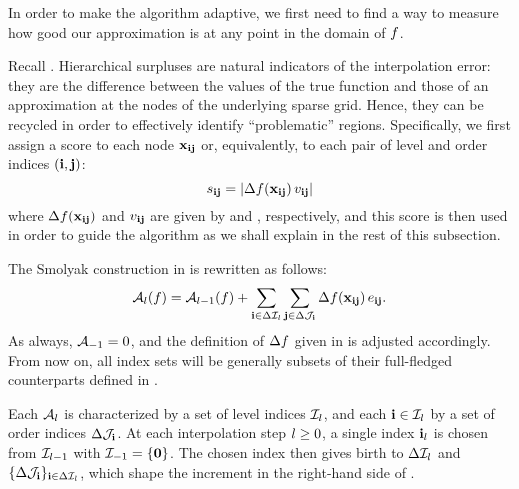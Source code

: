 In order to make the algorithm adaptive, we first need to find a way to measure
how good our approximation is at any point in the domain of $f$. 

 Recall
. Hierarchical surpluses are natural indicators of the
interpolation error: they are the difference between the values of the true
function and those of an approximation at the nodes of the underlying sparse
grid. Hence, they can be recycled in order to effectively identify
``problematic'' regions. Specifically, we first assign a score to each node
$\mathbf{x}_{\mathbf{i}\mathbf{j}}$ or, equivalently, to each pair of level and order indices $(\mathbf{i},
\mathbf{j})$:
\begin{equation} \elab{score}
  \score_{\vi\vj} = \left| \surplus(\vx_{\vi\vj}) \, \w_{\vi\vj} \right|
\end{equation}
where $\Delta f(\mathbf{x}_{\mathbf{i}\mathbf{j}})$ and $v_{\mathbf{i}\mathbf{j}}$ are given by  and
, respectively, and this score is then used in order to guide the
algorithm as we shall explain in the rest of this subsection.

The Smolyak construction in  is rewritten as follows:
\begin{equation} \elab{approximation}
  \approximation{\l}(\f) = \approximation{\l-1}(\f) + \sum_{\vi \in \Delta\lindex_\l} \sum_{\vj \in \Delta\oindex_\vi} \surplus(\vx_{\vi\vj}) \,
\e_{\vi\vj}.
\end{equation}
 As always, $\mathcal{A}_{-1} = 0$, and the definition of $\Delta f$
given in  is adjusted accordingly. From now on, all index sets
will be generally subsets of their full-fledged counterparts defined in
.

Each $\mathcal{A}_{l}$ is characterized by a set of level indices
$\mathcal{I}_l$, and each $\mathbf{i} \in \mathcal{I}_l$ by a set of order indices
$\Delta\mathcal{J}_{\mathbf{i}}$. At each interpolation step $l \geq 0$, a single index
$\mathbf{i}_l$ is chosen from $\mathcal{I}_{l-1}$ with $\mathcal{I}_{-1} = \{ \mathbf{0} \}$. The
chosen index then gives birth to $\Delta\mathcal{I}_l$ and $\{ \Delta\mathcal{J}_{\mathbf{i}}
\}_{\mathbf{i} \in \Delta\mathcal{I}_l}$, which shape the increment in the right-hand side
of .

